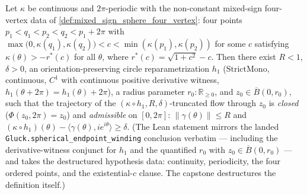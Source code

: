 \begin{lemma}
  \label{lem:mixed_spherical_endpoint_winding}
  Let $\kappa$ be continuous and $2\pi$-periodic with the non-constant
  mixed-sign four-vertex data of
  \cref{def:mixed_sign_sphere_four_vertex}: four points
  $p_1<q_1<p_2<q_2<p_1+2\pi$ with
  $\max\bigl(0,\kappa(q_1),\kappa(q_2)\bigr)<c<
  \min(\kappa(p_1),\kappa(p_2))$ for some $c$ satisfying
  $\kappa(\theta)>-r^\ast(c)$ for all $\theta$, where
  $r^\ast(c)=\sqrt{1+c^2}-c$. Then there exist $R<1$, $\delta>0$, an
  orientation-preserving circle reparametrization $h_1$
  ($\mathrm{StrictMono}$, continuous, $C^1$ with continuous positive
  derivative witness, $h_1(\theta+2\pi)=h_1(\theta)+2\pi$), a radius
  parameter $r_0:\mathbb R_{\ge0}$, and $z_0\in\overline{B}(0,r_0)$, such
  that the trajectory of the $(\kappa\circ h_1,R,\delta)$-truncated flow
  through $z_0$ is \emph{closed} ($\Phi(z_0,2\pi)=z_0$) and \emph{admissible}
  on $[0,2\pi]$: $\|\gamma(\theta)\|\le R$ and
  $(\kappa\circ h_1)(\theta)-\langle \gamma(\theta),ie^{i\theta}\rangle\ge\delta$.
  (The Lean statement mirrors the landed
  \texttt{Gluck.spherical\_endpoint\_winding} conclusion verbatim — including
  the derivative-witness conjunct for $h_1$ and the quantified $r_0$ with
  $z_0\in\overline{B}(0,r_0)$ — and takes the destructured hypothesis data:
  continuity, periodicity, the four ordered points, and the existential-$c$
  clause. The capstone destructures the definition itself.)
\end{lemma}

